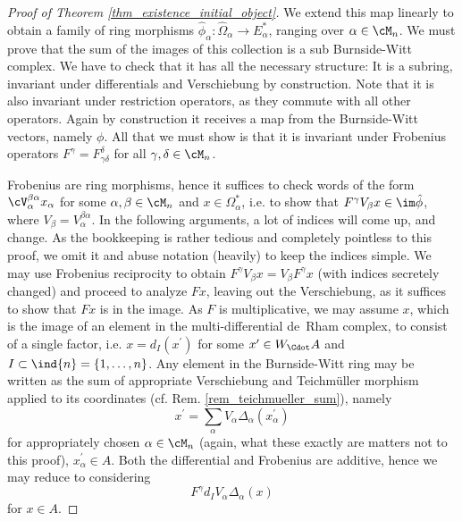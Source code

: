 \begin{proof}[Proof of Theorem \ref{thm_existence_initial_object}]
We extend this map linearly to obtain a family of ring morphisms $\hat\phi_\alpha: \hat \Omega_\alpha \to E^*_\alpha$, ranging over $\alpha \in \cM_n$. We must prove that the sum of the images of this collection is a sub Burnside-Witt complex. We have to check that it has all the necessary structure: It is a subring, invariant under differentials and Verschiebung by construction. Note that it is also invariant under restriction operators, as they commute with all other operators. Again by construction it receives a map from the Burnside-Witt vectors, namely $\phi$. All that we must show is that it is invariant under Frobenius operators $F^\gamma=F_{\gamma\delta}^{\delta}$ for all $\gamma,\delta \in \cM_n$.

Frobenius are ring morphisms, hence it suffices to check words of the form $\cV^{\beta\alpha}_\alpha x_\alpha$ for some $\alpha,\beta \in \cM_n$ and $x\in \Omega^*_\alpha$, i.e. to show that $F^\gamma V_\beta x \in \im \hat \phi$, where $V_\beta = V_\alpha^{\beta\alpha}$. In the following arguments, a lot of indices will come up, and change. As the bookkeeping is rather tedious and completely pointless to this proof, we omit it and abuse notation (heavily) to keep the indices simple. We may use Frobenius reciprocity to obtain $F^\gamma V_\beta x = V_\beta F^\gamma x$ (with indices secretely changed) and proceed to analyze $F x$, leaving out the Verschiebung, as it suffices to show that $Fx$ is in the image. As $F$ is multiplicative, we may assume $x$, which is the image of an element in the multi-differential de~Rham complex, to consist of a single factor, i.e. $x = d_I (x^\prime)$ for some $x^\prime \in W_\Cdot A$ and $I \subset \ind{n} = \{1,\ldots,n\}$. Any element in the Burnside-Witt ring may be written as the sum of appropriate Verschiebung and Teichm\"uller morphism applied to its coordinates (cf. Rem. \ref{rem_teichmueller_sum}), namely
\begin{equation*}
	x^\prime = \sum_\alpha V_\alpha \Delta_\alpha (x^\prime_\alpha)
\end{equation*}
for appropriately chosen $\alpha \in \cM_n$ (again, what these exactly are matters not to this proof), $x^\prime_\alpha \in A$. Both the differential and Frobenius are additive, hence we may reduce to considering
\begin{equation*}
F^\gamma d_I V_\alpha \Delta_\alpha (x)
\end{equation*}
for $x \in A$.


\end{proof}
